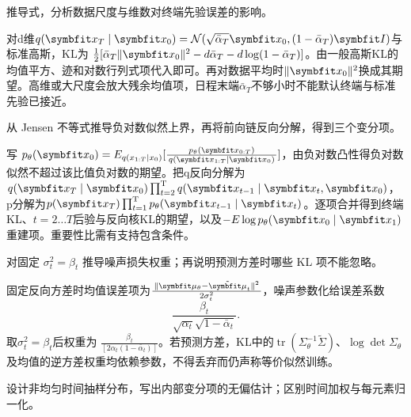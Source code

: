 \begin{exercises}
\begin{exercise}\optional 推导式，分析数据尺度与维数对终端先验误差的影响。

\begin{solution}
对d维$q(\vect{x}_T\mid \vect{x}_0)=\mathcal N(\sqrt{\bar\alpha_T}\vect{x}_0,(1-\bar\alpha_T)\mat{I})$与标准高斯，KL为 $\tfrac12[\bar\alpha_T\|\vect{x}_0\|^2-d\bar\alpha_T-d\log(1-\bar\alpha_T)]$。由一般高斯KL的均值平方、迹和对数行列式项代入即可。再对数据平均时$\|\vect{x}_0\|^2$换成其期望。高维或大尺度会放大残余均值项，日程末端$\bar\alpha_T$不够小时不能默认终端与标准先验已接近。
\end{solution}
\end{exercise}

\begin{exercise} 从 Jensen 不等式推导负对数似然上界，再将前向链反向分解，得到三个变分项。

\begin{solution}
写 $p_\theta(\vect{x}_0)=E_{q(x_{1:T}\mid x_0)}[\frac{p_\theta(\vect{x}_{0:T})}{q(\vect{x}_{1:T}\mid \vect{x}_0)}]$，由负对数凸性得负对数似然不超过该比值负对数的期望。把q反向分解为$q(\vect{x}_T\mid \vect{x}_0)\prod_{t=2}^{\mathrm{T}}q(\vect{x}_{t-1}\mid \vect{x}_t,\vect{x}_0)$，p分解为$p(\vect{x}_T)\prod_{t=1}^{\mathrm{T}}p_\theta(\vect{x}_{t-1}\mid \vect{x}_t)$。逐项合并得到终端KL、$t=2\ldots T$后验与反向核KL的期望，以及$-E\log p_\theta(\vect{x}_0\mid \vect{x}_1)$重建项。重要性比需有支持包含条件。
\end{solution}
\end{exercise}

\begin{exercise} 对固定 $\sigma_t^2=\beta_t$ 推导噪声损失权重；再说明预测方差时哪些 KL 项不能忽略。

\begin{solution}
固定反向方差时均值误差项为$\frac{\|\vect{\mu}_\theta-\tilde{\vect{\mu}}_t\|^2}{2\sigma_t^2}$，噪声参数化给误差系数
\[
 \frac{\beta_t}{\sqrt{\alpha_t}\sqrt{1-\bar\alpha_t}}.
\]
取$\sigma_t^2=\beta_t$后权重为 $\frac{\beta_t}{[2\alpha_t(1-\bar\alpha_t)]}$。若预测方差，KL中的$\operatorname{tr}(\Sigma_\theta^{-1}\tilde\Sigma)$、$\log\det\Sigma_\theta$及均值的逆方差权重均依赖参数，不得丢弃而仍声称等价似然训练。
\end{solution}
\end{exercise}

\begin{exercise}\optional 设计非均匀时间抽样分布，写出内部变分项的无偏估计；区别时间加权与每元素归一化。


\end{exercise}
\end{exercises}

